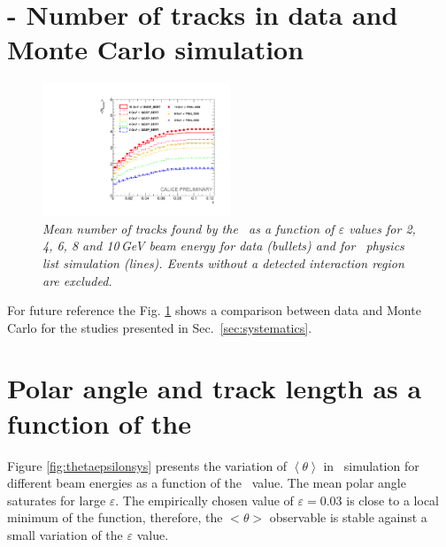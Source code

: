 \begin{appendices}
	\section{\ep - Number of tracks in data and Monte Carlo simulation}\label{app:a}
	
	\begin{figure}[H]
		\centering
		\includegraphics[width=0.5\textwidth]{ECAL/plots/combination.pdf}
		\caption{\label{fig:epsilonsysdata} \sl Mean number of tracks found by the \tfa\ as a function of $\varepsilon$ values for 2, 4, 6, 8 and 10\,GeV beam energy for data (bullets) and for \qgsp\ physics list simulation (lines). Events without a detected interaction region are excluded.}
	\end{figure}
	
	For future reference the Fig. \ref{fig:epsilonsysdata} shows a comparison between data and Monte Carlo for the studies presented in Sec.~\ref{sec:systematics}. 
	
	\section{Polar angle and track length as a function of the \ep}\label{app:b}
	
	Figure \ref{fig:thetaepsilonsys} presents the variation of $\left<\theta\right>$ in \qgsp\ simulation  for different beam energies as a function of the \ep\ value. 
	The mean polar angle saturates for large $\varepsilon$. The empirically chosen value of $\varepsilon=0.03$ is close to a local minimum of the function, therefore, the $<\theta>$ observable is stable against a small variation of the $\varepsilon$ value. 
	

\end{appendices}
